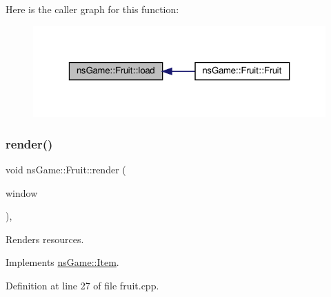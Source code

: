Here is the caller graph for this function\+:\nopagebreak
\begin{figure}[H]
\begin{center}
\leavevmode
\includegraphics[width=323pt]{classns_game_1_1_fruit_a28c4ae21607dbad699602528c6ffc583_icgraph}
\end{center}
\end{figure}
\mbox{\label{classns_game_1_1_fruit_a99622754f8cf90bb285b4808e98372c7}} 
\subsubsection{\texorpdfstring{render()}{render()}}
{\footnotesize\ttfamily void ns\+Game\+::\+Fruit\+::render (\begin{DoxyParamCaption}\item[{Min\+GL \&}]{window }\end{DoxyParamCaption})\hspace{0.3cm}{\ttfamily [override]}, {\ttfamily [virtual]}}



Renders resources. 



Implements \hyperlink{structns_game_1_1_item_a451b6491efc475c9ca47dcccdbbde707}{ns\+Game\+::\+Item}.



Definition at line 27 of file fruit.\+cpp.

